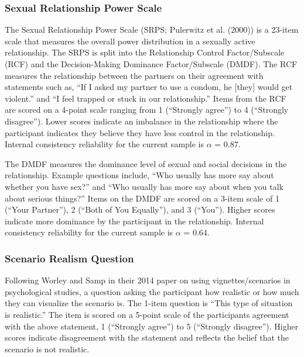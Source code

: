 \documentclass[
  english,
  a4paper]{apa7}
\begin{document}
\hypertarget{sexual-relationship-power-scale}{%
\subsubsection{Sexual Relationship Power Scale}\label{sexual-relationship-power-scale}}

The Sexual Relationship Power Scale (SRPS; Pulerwitz et al. (2000)) is a 23-item scale that measures the overall power distribution in a sexually active relationship. The SRPS is split into the Relationship Control Factor/Subscale (RCF) and the Decision-Making Dominance Factor/Subscale (DMDF). The RCF measures the relationship between the partners on their agreement with statements such as, ``If I asked my partner to use a condom, he {[}they{]} would get violent.'' and ``I feel trapped or stuck in our relationship.'' Items from the RCF are scored on a 4-point scale ranging from 1 (``Strongly agree'') to 4 (``Strongly disagree''). Lower scores indicate an imbalance in the relationship where the participant indicates they believe they have less control in the relationship. Internal consistency reliability for the current sample is \(\alpha\) = 0.87.

The DMDF measures the dominance level of sexual and social decisions in the relationship. Example questions include, ``Who usually has more say about whether you have sex?'' and ``Who usually has more say about when you talk about serious things?'' Items on the DMDF are scored on a 3-item scale of 1 (``Your Partner''), 2 (``Both of You Equally''), and 3 (``You''). Higher scores indicate more dominance by the participant in the relationship. Internal consistency reliability for the current sample is \(\alpha\) = 0.64.

\hypertarget{scenario-realism-question}{%
\subsubsection{Scenario Realism Question}\label{scenario-realism-question}}

Following Worley and Samp in their 2014 paper on using vignettes/scenarios in psychological studies, a question asking the participant how realistic or how much they can visualize the scenario is. The 1-item question is ``This type of situation is realistic.'' The item is scored on a 5-point scale of the participants agreement with the above statement, 1 (``Strongly agree'') to 5 (``Strongly disagree''). Higher scores indicate disagreement with the statement and reflects the belief that the scenario is not realistic.
\end{document}
